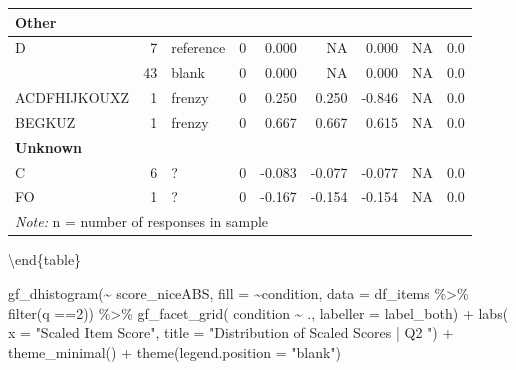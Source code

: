 \documentclass[
  letterpaper,
  DIV=11,
  numbers=noendperiod]{scrreprt}
\newenvironment{Shaded}{\begin{snugshade}}{\end{snugshade}}
\newcommand{\AttributeTok}[1]{\textcolor[rgb]{0.40,0.45,0.13}{#1}}
\newcommand{\DecValTok}[1]{\textcolor[rgb]{0.68,0.00,0.00}{#1}}
\newcommand{\FunctionTok}[1]{\textcolor[rgb]{0.28,0.35,0.67}{#1}}
\newcommand{\NormalTok}[1]{\textcolor[rgb]{0.00,0.23,0.31}{#1}}
\newcommand{\SpecialCharTok}[1]{\textcolor[rgb]{0.37,0.37,0.37}{#1}}
\newcommand{\StringTok}[1]{\textcolor[rgb]{0.13,0.47,0.30}{#1}}
\begin{document}
\begin{tabular}[t]{l|r|l|r|r|r|r|r|r}
\hline
\multicolumn{9}{l}{\textbf{Other}}\\
\hline
\hspace{1em}D & 7 & reference & 0 & 0.000 & NA & 0.000 & NA & 0.0\\
\hline
\hspace{1em} & 43 & blank & 0 & 0.000 & NA & 0.000 & NA & 0.0\\
\hline
\hspace{1em}ACDFHIJKOUXZ & 1 & frenzy & 0 & 0.250 & 0.250 & -0.846 & NA & 0.0\\
\hline
\hspace{1em}BEGKUZ & 1 & frenzy & 0 & 0.667 & 0.667 & 0.615 & NA & 0.0\\
\hline
\multicolumn{9}{l}{\textbf{Unknown}}\\
\hline
\hspace{1em}C & 6 & ? & 0 & -0.083 & -0.077 & -0.077 & NA & 0.0\\
\hline
\hspace{1em}FO & 1 & ? & 0 & -0.167 & -0.154 & -0.154 & NA & 0.0\\
\hline
\multicolumn{9}{l}{\rule{0pt}{1em}\textit{Note: } n = number of responses in sample}\\
\end{tabular}

\textbackslash end\{table\}

\begin{Shaded}
\begin{Highlighting}[]
\FunctionTok{gf\_dhistogram}\NormalTok{(}\SpecialCharTok{\textasciitilde{}}\NormalTok{ score\_niceABS, }\AttributeTok{fill =} \SpecialCharTok{\textasciitilde{}}\NormalTok{condition, }\AttributeTok{data =}\NormalTok{ df\_items }\SpecialCharTok{\%\textgreater{}\%} \FunctionTok{filter}\NormalTok{(q }\SpecialCharTok{==}\DecValTok{2}\NormalTok{)) }\SpecialCharTok{\%\textgreater{}\%} 
  \FunctionTok{gf\_facet\_grid}\NormalTok{( condition }\SpecialCharTok{\textasciitilde{}}\NormalTok{ ., }\AttributeTok{labeller =}\NormalTok{ label\_both) }\SpecialCharTok{+} 
  \FunctionTok{labs}\NormalTok{( }\AttributeTok{x =} \StringTok{"Scaled Item Score"}\NormalTok{, }\AttributeTok{title =} \StringTok{"Distribution of Scaled Scores | Q2 "}\NormalTok{) }\SpecialCharTok{+} 
  \FunctionTok{theme\_minimal}\NormalTok{() }\SpecialCharTok{+} \FunctionTok{theme}\NormalTok{(}\AttributeTok{legend.position =} \StringTok{"blank"}\NormalTok{)}
\end{Highlighting}
\end{Shaded}
\end{document}
